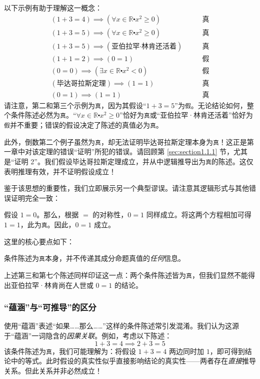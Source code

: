 以下示例有助于理解这一概念：
\begin{align*}
    (1 + 3 = 4) \implies (\forall x \in \mathbb{R} \centerdot x^2 \ge 0)  \qquad &\text{真} \\
    (1 + 3 = 5) \implies (\forall x \in \mathbb{R} \centerdot x^2 \ge 0)  \qquad &\text{真} \\
    (1 + 3 = 5) \implies (\text{亚伯拉罕·林肯还活着})  \qquad &\text{真} \\
    (1 + 1 = 2) \implies (0 = 1)  \qquad &\text{假} \\
    (0 = 0) \implies (\exists x \in \mathbb{R} \centerdot x^2 < 0)  \qquad &\text{假} \\
    (\text{毕达哥拉斯定理}) \implies (1 = 1)  \qquad &\text{真} \\
    (0 = 1) \implies (1 = 1)  \qquad &\text{真}
\end{align*}
请注意，第二和第三个示例为\verb|真|，因为其假设``$1 + 3 = 5$''为\verb|假|。无论结论如何，整个条件陈述必然为\verb|真|。``$\forall x \in \mathbb{R} \centerdot x^2 \ge 0$''恰好为\verb|真|或``亚伯拉罕·林肯还活着''恰好为\verb|假|并不重要；错误的假设决定了陈述的真值必为\verb|真|。

此外，倒数第二个例子虽然为\verb|真|，却无法证明毕达哥拉斯定理本身为\verb|真|！这正是第一章中对该定理的错误``证明''所犯的错误。请回顾第 \ref{sec:section1.1.1} 节，尤其是``证明 2''。我们假设毕达哥拉斯定理成立，并从中逻辑推导出为\verb|真|的陈述。这仅表明推理有效，并不证明假设成立！

鉴于该思想的重要性，我们立即展示另一个典型谬误。请注意其逻辑形式与其他错误证明完全一致：

\begin{spoof}
    假设 $1 = 0$。那么，根据 $=$ 的对称性，$0 = 1$ 同样成立。将这两个方程相加可得 $1 = 1$，此为\verb|真|。因此，$0 = 1$ 成立。
\end{spoof}
这里的核心要点如下：
\begin{center}
    条件陈述为\verb|真|本身，并不传递其成分命题真值的\emph{任何}信息。
\end{center}
上述第三和第七个陈述同样印证这一点：两个条件陈述皆为\verb|真|，但我们显然不能得出亚伯拉罕·林肯尚在人世或 $0 = 1$ 的结论。

\subsubsection*{``蕴涵''与``可推导''的区分}

使用``蕴涵''表述``如果……那么……''这样的条件陈述常引发混淆。我们认为这源于``蕴涵''一词隐含的\emph{因果关联}。例如，考虑以下陈述：
\[1 + 3 = 4 \implies 2 + 3 = 5\]
该条件陈述为\verb|真|，我们可能理解为：将假设 $1 + 3 = 4$ 两边同时加 $1$，即可得到结论中的等式。此时假设的真实性似乎直接影响结论的真实性——两者存在\emph{直接}推导关系。但此关系并非必然成立！


